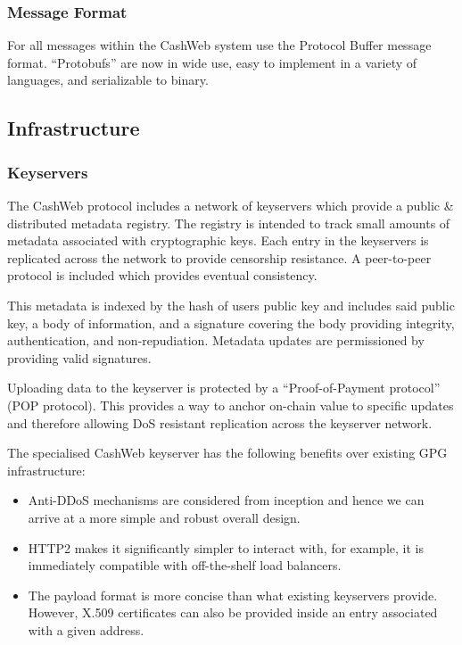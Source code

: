 \documentclass{article}
\begin{document}
\subsubsection{Message Format}

For all messages within the CashWeb system use the Protocol Buffer message format. ``Protobufs'' are now in wide use, easy to implement in a variety of languages, and serializable to binary.

\subsection{Infrastructure}

\subsubsection{Keyservers}

The CashWeb protocol includes a network of keyservers which provide a public \& distributed metadata registry. The registry is intended to track small amounts of metadata associated with cryptographic keys. Each entry in the keyservers is replicated across the network to provide censorship resistance. A peer-to-peer protocol is included which provides eventual consistency.

This metadata is indexed by the hash of users public key and includes said public key, a body of information, and a signature covering the body providing integrity, authentication, and non-repudiation. Metadata updates are permissioned by providing valid signatures.

Uploading data to the keyserver is protected by a ``Proof-of-Payment protocol'' (POP protocol). This provides a way to anchor on-chain value to specific updates and therefore allowing DoS resistant replication across the keyserver network.

The specialised CashWeb keyserver has the following benefits over existing GPG infrastructure:
\begin{itemize}
  \item Anti-DDoS mechanisms are considered from inception and hence we can arrive at a more simple and robust overall design.
  \item HTTP2 makes it significantly simpler to interact with, for example, it is immediately compatible with off-the-shelf load balancers.
  \item The payload format is more concise than what existing keyservers provide. However, X.509 certificates can also be provided inside an entry associated with a given address.
\end{itemize}
\end{document}
